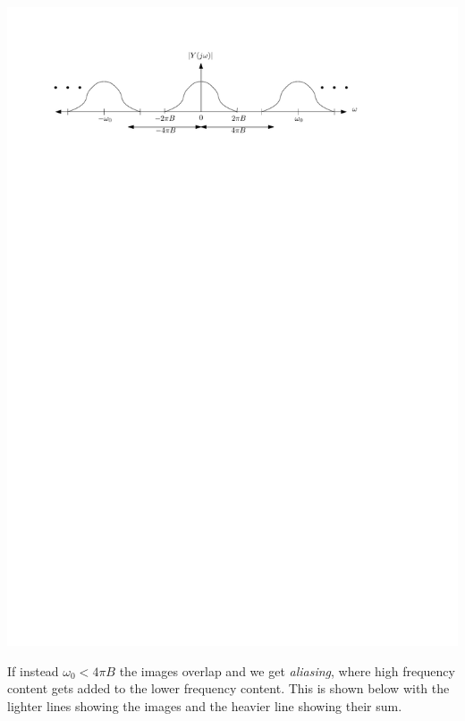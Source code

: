 \begin{center}
  \includegraphics[scale=1]{graphics/bandlimitedsampled1.pdf}
\end{center}
If instead $\omega_0 < 4\pi B$ the images overlap and we get \emph{aliasing}, where high frequency content gets added to the lower frequency content. This is shown below with the lighter lines showing the images and the heavier line showing their sum.
